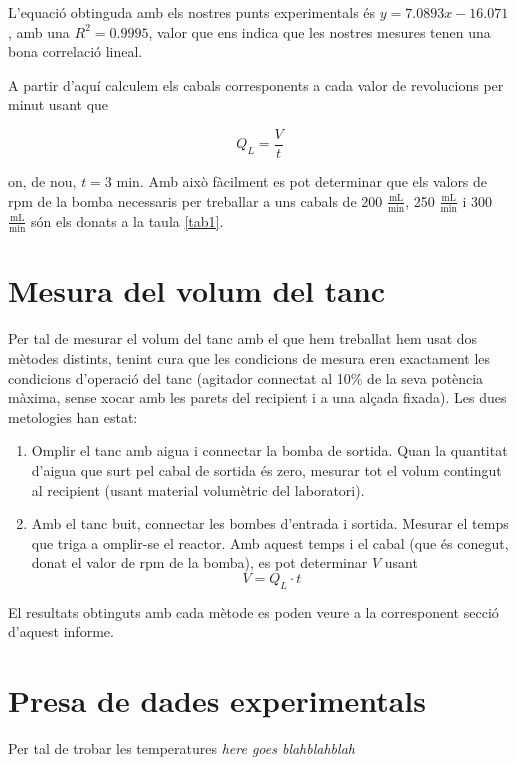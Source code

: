 \documentclass[10pt, twoside]{article}
\begin{document}
L'equació obtinguda amb els nostres punts experimentals és $y=7.0893x-16.071$, amb una $R^2 = 0.9995$, valor que ens indica que les nostres mesures tenen una bona correlació lineal.

A partir d'aquí calculem els cabals corresponents a cada valor de revolucions per minut usant que

\begin{equation}
    Q_L = \frac{V}{t}
\end{equation}

on, de nou, $t=3$ min. Amb això fàcilment es pot determinar que els valors de rpm de la bomba necessaris per treballar a uns cabals de 200 $\frac{\text{mL}}{\text{min}}$, 250 $\frac{\text{mL}}{\text{min}}$ i 300 $\frac{\text{mL}}{\text{min}}$ són els donats a la taula \ref{tab1}.

\section{Mesura del volum del tanc}
Per tal de mesurar el volum del tanc amb el que hem treballat hem usat dos mètodes distints, tenint cura que les condicions de mesura eren exactament les condicions d'operació del tanc (agitador connectat al 10$\%$ de la seva potència màxima, sense xocar amb les parets del recipient i a una alçada fixada). Les dues metologies han estat:
\begin{enumerate}
    \item Omplir el tanc amb aigua i connectar la bomba de sortida. Quan la quantitat d'aigua que surt pel cabal de sortida és zero, mesurar tot el volum contingut al recipient (usant material volumètric del laboratori).
    \item Amb el tanc buit, connectar les bombes d'entrada i sortida. Mesurar el temps que triga a omplir-se el reactor. Amb aquest temps i el cabal (que és conegut, donat el valor de rpm de la bomba), es pot determinar $V$ usant
    \begin{equation}
        V = Q_L \cdot t
    \end{equation}
\end{enumerate}
El resultats obtinguts amb cada mètode es poden veure a la corresponent secció d'aquest informe.

\section{Presa de dades experimentals}
Per tal de trobar les temperatures  \textit{here goes blahblahblah}
\end{document}
